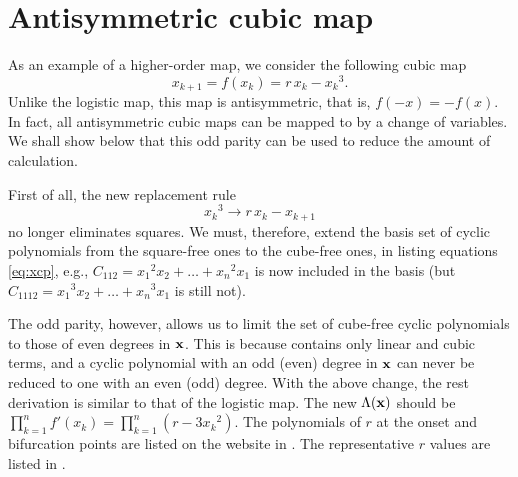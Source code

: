 \documentclass{ws-ijbc}
\begin{document}
\section{\label{sec:cubic}Antisymmetric cubic map}


As an example of a higher-order %
map, we consider the following cubic map \cite{strogatz}
%
\begin{equation}
  x_{k + 1} = f(x_k) = r \, x_k - {x_k}^3.
\label{eq:cubic}
\end{equation}
%
Unlike the logistic map, this map is antisymmetric,
  that is, $f(-x) = -f(x)$.
%
In fact, all antisymmetric cubic maps \cite{may2, brown3, brown4}
  can be mapped to  by a change of variables.
We shall show below that this odd parity can be used to reduce the amount of calculation.

First of all, the new replacement rule
\begin{equation}
  {x_k}^3 \rightarrow r \, x_k - x_{k+1}
\label{eq:cubreplace}
\end{equation}
no longer eliminates squares.
%
We must, therefore, extend the basis set of cyclic polynomials
  from the square-free ones to the cube-free ones,
  in listing equations \eqref{eq:xcp},
  e.g.,
  $C_{112} = {x_1}^2 x_2 + \dots + {x_n}^2 x_1$
  is now included in the basis
  (but
  $C_{1112} = {x_1}^3 x_2 + \dots + {x_n}^3 x_1$
  is still not).


The odd parity, however, allows us to limit
  the set of cube-free cyclic polynomials
  to those of even degrees in $\mathbf{x}$.
%
This is because  contains only linear and cubic terms,
and a cyclic polynomial with an odd (even) degree in $\mathbf{x}$
can never be reduced to one with an even (odd) degree.
%
%
%
%
%
%
With the above change, the rest derivation is similar to that of the logistic map.
The new $\Lambda(\mathbf{x})$ should be
$\prod_{k=1}^n f'(x_k) = \prod_{k=1}^n (r - 3 {x_k}^2)$.
%
The polynomials of $r$
  at the onset and bifurcation points
  are listed on the website in .
%
The representative $r$ values are listed in .
%
\end{document}
